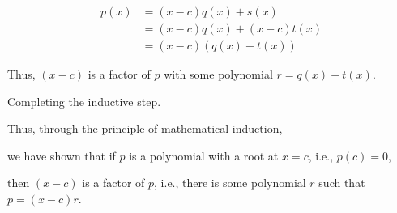 {{		\begin{align*}
			p(x) & = (x-c)q(x) + s(x)      \\
			     & = (x-c)q(x) + (x-c)t(x) \\
			     & = (x-c)(q(x) + t(x))
		\end{align*}

		Thus, \((x-c)\) is a factor of \(p\) with some polynomial \(r = q(x) + t(x)\).

		Completing the inductive step.
	}

	\parinf
	Thus, through the principle of mathematical induction,

	we have shown that if \(p\) is a polynomial with a root at \(x=c\), i.e., \(p(c)=0\),

	then \((x-c)\) is a factor of \(p\), i.e., there is some polynomial \(r\) such that \(p=(x-c) r\).
}
